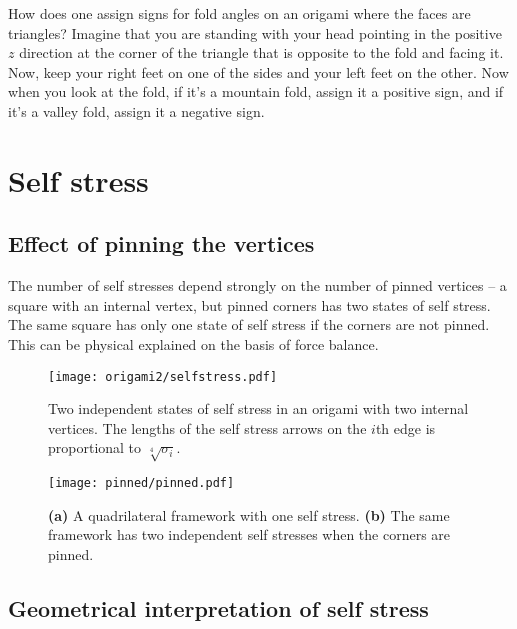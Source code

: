 How does one assign signs for fold angles on an origami where the faces are triangles?
Imagine that you are standing with your head pointing in the positive $z$ direction at the corner of the triangle that is opposite to the fold and facing it.
Now, keep your right feet on one of the sides and your left feet on the other.
Now when you look at the fold, if it's a mountain fold, assign it a positive sign, and if it's a valley fold, assign it a negative sign.

\section{Self stress}

\subsection{Effect of pinning the vertices}

The number of self stresses depend strongly on the number of pinned vertices -- a square with an internal vertex, but pinned corners has two states of self stress.  The same square has only one state of self stress if the corners are not pinned.
This can be physical explained on the basis of force balance.

\begin{figure}
  \begin{center}
    \texttt{[image: origami2/selfstress.pdf]}
  \end{center}
  \caption{
    Two independent states of self stress in an origami with two internal vertices.
    The lengths of the self stress arrows on the $i$th edge is proportional to $\sqrt[4]{\sigma_{i}}$.
  }
  \label{fig:origami2_selfstress}
\end{figure}
%
\begin{figure}
  \begin{center}
    \texttt{[image: pinned/pinned.pdf]}
  \end{center}
  \caption{
    \textsf{\textbf{(a)}} A quadrilateral framework with one self stress.
    \textsf{\textbf{(b)}} The same framework has two independent self stresses when the corners are pinned.
  }
  \label{fig:quad_pinned}
\end{figure}


\subsection{Geometrical interpretation of self stress}

